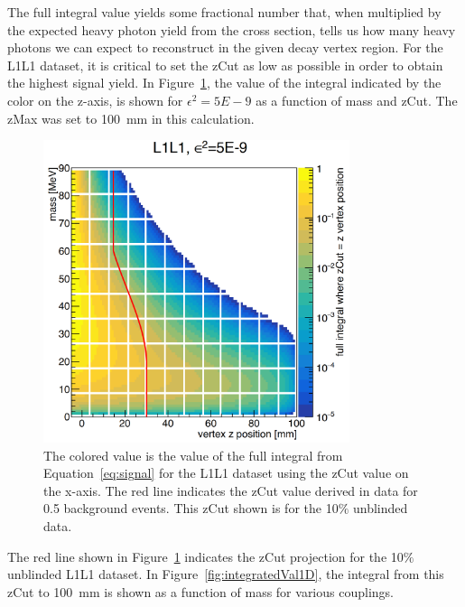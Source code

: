 \documentclass[twoside]{article}
\begin{document}
The full integral value yields some fractional number that, when multiplied by the expected heavy photon yield from the cross section, tells us how many heavy photons we can expect to reconstruct in the given decay vertex region. For the L1L1 dataset, it is critical to set the zCut as low as possible in order to obtain the highest signal yield. In Figure~\ref{fig:integratedVal2D}, the value of the integral indicated by the color on the z-axis, is shown for $\epsilon^{2} = 5E-9$ as a function of mass and zCut. The zMax was set to 100~mm in this calculation. 

\begin{figure}[H]
  \centering
      \includegraphics[width=0.8\textwidth]{plots/L1L1_eff_mz.png}
  \caption{The colored value is the value of the full integral from Equation~\eqref{eq:signal} for the L1L1 dataset using the zCut value on the x-axis. The red line indicates the zCut value derived in data for 0.5 background events. This zCut shown is for the 10$\%$ unblinded data.}
  \label{fig:integratedVal2D}
\end{figure} 

The red line shown in Figure~\ref{fig:integratedVal2D} indicates the zCut projection for the 10$\%$ unblinded L1L1 dataset. In Figure~\ref{fig:integratedVal1D}, the integral from this zCut to 100~mm is shown as a function of mass for various couplings. 
\end{document}
